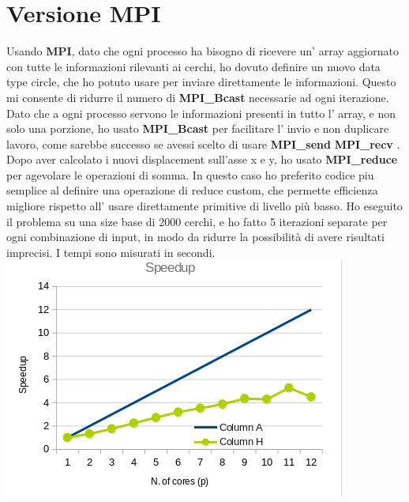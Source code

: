 \documentclass[a4paper,11pt, twoside]{report}
\begin{document}
\section*{Versione MPI}
Usando \textbf{MPI}\cite{mpi}, dato che ogni processo ha bisogno di ricevere un' array aggiornato con tutte le informazioni rilevanti ai cerchi, 
ho dovuto definire un nuovo data type circle, che ho potuto usare per inviare direttamente le informazioni. 
Questo mi consente di ridurre il numero di  \textbf{MPI\_Bcast} \cite{mpi_bcast} necessarie ad ogni iterazione. Dato che a ogni processo servono le
informazioni presenti in tutto l' array, e non solo una porzione, ho usato \textbf{MPI\_Bcast}\cite{mpi_bcast} per facilitare l' invio e non duplicare lavoro,
come sarebbe successo se avessi scelto di usare \textbf{MPI\_send} \cite{mpi_send} \textbf{MPI\_recv} \cite{mpi_recv}. 
Dopo aver calcolato i nuovi displacement sull'asse x e y, ho usato \textbf{MPI\_reduce} \cite{mpi_reduce} per agevolare le operazioni di somma.
In questo caso ho preferito codice piu semplice al definire una operazione di reduce custom,
che permette efficienza migliore rispetto all' usare direttamente primitive di livello più basso.
Ho eseguito il problema su una size base di 2000 cerchi, e ho fatto 5 iterazioni separate per ogni combinazione di input, in modo da ridurre la possibilità di avere risultati imprecisi.
I tempi sono misurati in secondi.
\newline
\includegraphics[scale=0.5]{images/mpi_speedup.png}
\end{document}
